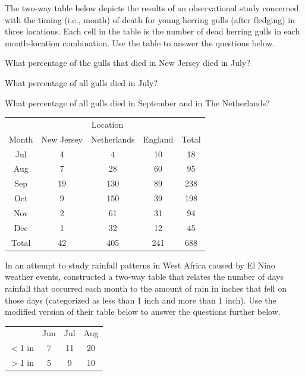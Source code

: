 \documentclass[10pt,openany]{book}\usepackage[]{graphicx}\usepackage[]{color}
\begin{document}
\begin{exsection}
  \item \label{revex:cbEDAGulls} The two-way table below depicts the results of an observational study concerned with the timing (i.e., month) of death for young herring gulls (after fledging) in three locations.  Each cell in the table is the number of dead herring gulls in each month-location combination.  Use the table to answer the questions below. 
  \begin{Enumerate}
    \item What percentage of the gulls that died in New Jersey died in July?
    \item What percentage of all gulls died in July?
    \item What percentage of all gulls died in September and in The Netherlands?
  \end{Enumerate}

  \begin{center}
    \begin{tabular}{c|ccc|c}
      \hline\hline
      \multicolumn{1}{c}{} & \multicolumn{3}{c}{Location} &  \\
      \cline{2-4}
      \multicolumn{1}{c}{Month} & New Jersey & Netherlands & \multicolumn{1}{c}{England} & Total \\
      \hline
      Jul & 4 & 4 & 10 & 18 \\
      Aug & 7 & 28 & 60 & 95 \\
      Sep & 19 & 130 & 89 & 238 \\
      Oct & 9 & 150 & 39 & 198 \\
      Nov & 2 & 61 & 31 & 94 \\
      Dec & 1 & 32 & 12 & 45 \\
      \hline
      Total & 42 & 405 & 241 & 688 \\
      \hline\hline
    \end{tabular}
  \end{center}

  \item \label{revex:cbEDAElNino} In an attempt to study rainfall patterns in West Africa caused by El Nino weather events, \cite{NicholsonKim1997} constructed a two-way table that relates the number of days rainfall that occurred each month to the amount of rain in inches that fell on those days (categorized as less than 1 inch and more than 1 inch).  Use the modified version of their table below to answer the questions further below.  
    \begin{center}
    \begin{tabular}{c|ccc|}
      \hline\hline
      \multicolumn{1}{c}{} & Jun & Jul & \multicolumn{1}{c}{Aug} \\
      \cline{2-4}
      $<$1 in & 7 & 11 & 20 \\
      $>$1 in & 5 & 9 & 10 \\
      \hline\hline
    \end{tabular}
  \end{center}


\end{exsection}
\end{document}
